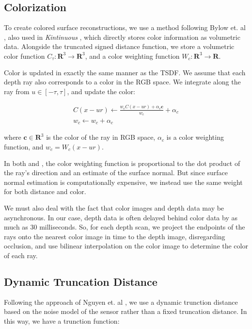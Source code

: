 \documentclass[conference,10pt]{IEEEtran}
\begin{document}
\subsection{Colorization}
To create colored surface reconstructions, we use a method following Bylow et.
al \cite{Bylow2013}, also used in \textit{Kintinuous} \cite{Whelan2013}, which
directly stores color information as volumetric data. Alongside the
truncated signed distance function, we store a volumetric color function
$C_\tau : \mathbf{R}^3 \to \mathbf{R}^3$, and a color weighting function $W_c :
\mathbf{R}^3 \to \mathbf{R}$.

Color is updated in exactly the same manner as the TSDF. We assume that each
depth ray also corresponds to a color in the RGB space. We integrate along the
ray from $u \in [-\tau, \tau]$, and update the color:

\begin{align*}
C(x - ur) \gets \frac{w_c C(x - ur) + \alpha_c \mathbf{c}}{w_c}
+\alpha_c
\\
%
w_c \gets w_c + \alpha_c
\end{align*}

\noindent where $\mathbf{c} \in \mathbf{R}^3$ is the color of the ray in RGB
space, $\alpha_c$ is a color weighting function, and $w_c = W_c(x -
ur)$.

In both \cite{Bylow2013} and \cite{Whelan2013}, the color weighting function is
proportional to the dot product of the ray's direction and an estimate of the
surface normal. But since surface normal estimation is computationally
expensive, we instead use the same weight for both distance and color.

We must also deal with the fact that color images and depth data may be
asynchronous. In our case, depth data is often delayed behind color data by as
much as 30 milliseconds. So, for each depth scan, we project the endpoints of
the rays onto the nearest color image in time to the depth image, disregarding
occlusion, and use bilinear interpolation on the color image to determine the
color of each ray.

\subsection{Dynamic Truncation Distance}
Following the approach of Nguyen et. al \cite{Nguyen2012}, we use a dynamic
trunction distance based on the noise model of the sensor rather than a fixed
truncation distance. In this way, we have a trunction function:
\end{document}
